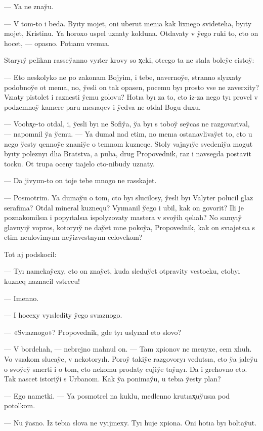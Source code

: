 \documentclass[10pt]{book}
\begin{document}
— Ya ne znay̆u.

— V tom-to i beda. Byıty mojet, oni uberut menıa kak lixnego svidetelıa, byıty mojet, Kristinu. Ya horoxo uspel uznaty kolduna. Otdavaty v y̆ego ruki to, cto on hocet, — opasno. Potıanu vremıa.

Staryıy̆ pelikan rassey̆anno vyıter krovy so x̨eki, otcego ta ne stala boley̆e cistoy̆:

— Eto neskolyko ne po zakonam Bojyim, i tebe, navernoy̆e, stranno slyıxaty podobnoy̆e ot menıa, no, y̆esli on tak opasen, pocemu byı prosto vse ne zaverxity? Vzıaty pistolet i raznesti y̆emu golovu? Hotıa byı za to, cto iz-za nego tyı provel v podzemnoy̆ kamere paru mesıaqev i y̆edva ne otdal Bogu duxu.

— Voobx̨e-to otdal, i, y̆esli byı ne Sofiy̆a, y̆a byı s toboy̆ sey̆cas ne razgovarival, — napomnil y̆a y̆emu. — Ya dumal nad etim, no menıa ostanavlivay̆et to, cto u nego y̆esty qennoy̆e znaniy̆e o temnom kuzneqe. Stoly vajnyıy̆e svedeniy̆a mogut byıty poleznyı dlıa Bratstva, a pulıa, drug Propovednik, raz i navsegda postavit tocku. Ot trupa oceny tıajelo cto-nibudy uznaty.

— Da jivyım-to on toje tebe mnogo ne rasskajet.

— Posmotrim. Ya dumay̆u o tom, cto byı slucilosy, y̆esli byı Valyter polucil glaz serafima? Otdal mineral kuznequ? Vyımanil y̆ego i ubil, kak on govorit? Ili je poznakomilsıa i popyıtalsıa ispolyzovaty mastera v svoy̆ih qelıah? No samyıy̆ glavnyıy̆ vopros, kotoryıy̆ ne day̆et mne pokoy̆a, Propovednik, kak on svıajetsıa s etim neulovimyım ney̆izvestnyım celovekom?

Tot aj podskocil:

— Tyı namekay̆exy, cto on znay̆et, kuda sleduy̆et otpravity vestocku, ctobyı kuzneq naznacil vstrecu!

— Imenno.

— I hocexy vyısledity y̆ego svıaznogo.

— «Svıaznogo»? Propovednik, gde tyı uslyıxal eto slovo?

— V bordelıah, — nebrejno mahnul on. — Tam xpionov ne menyxe, cem xlıuh. Vo vsıakom slucay̆e, v nekotoryıh. Poroy̆ takiy̆e razgovoryı vedutsıa, cto y̆a jaley̆u o svoy̆ey̆ smerti i o tom, cto nekomu prodaty cujiy̆e tay̆nyı. Da i grehovno eto. Tak nascet istoriy̆i s Urbanom. Kak y̆a ponimay̆u, u tebıa y̆esty plan?

— Ego nametki. — Ya posmotrel na kuklu, medlenno krutıax̨uy̆usıa pod potolkom.

— Nu y̆asno. Iz tebıa slova ne vyıjmexy. Tyı huje xpiona. Oni hotıa byı boltay̆ut.
\end{document}
